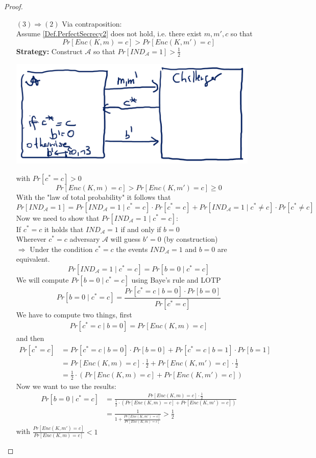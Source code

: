 \begin{proof}
\begin{itemize}
    			\item[$(3) \Rightarrow (2)$] Via contraposition:\\
    				Assume \cref{Def.PerfectSecrecy2} does not hold, i.e. there exist $m,m',c$ so that
    					$$Pr[Enc(K,m)=c] > Pr[Enc(K,m')=c]$$
    				\textbf{Strategy:} Construct $\mathcal{A}$ so that $Pr[IND_{\mathcal{A}}=1] > \frac{1}{2}$
    				\begin{center}
						\includegraphics[width=120mm]{Graphics/Perfect Secrecy/Proof(3)to(2).png}\newline
					\end{center}
					with $Pr[c^* = c] > 0$
						$$Pr[Enc(K,m)=c] > Pr[Enc(K,m')=c] \geq 0$$
					With the "law of total probability" it follows that
						$$Pr[IND_{\mathcal{A}}=1] = Pr[IND_{\mathcal{A}}=1 \mid c^*=c] \cdot Pr[c^* = c] + Pr[IND_{\mathcal{A}}=1 \mid c^* \neq c] \cdot Pr[c^* \neq c]$$
					Now we need to show that $Pr[IND_{\mathcal{A}}=1 \mid c^*=c]$:\\
					If $c^* = c$ it holds that $IND_{\mathcal{A}}=1$ if and only if $b=0$\\
					Wherever $c^* = c$ adversary $\mathcal{A}$ will guess $b' = 0$ (by construction)\\
					$\Rightarrow$ Under the condition $c^* = c$ the events $IND_{\mathcal{A}}=1$ and $b=0$ are equivalent.
						$$Pr[IND_{\mathcal{A}}=1 \mid c^* = c] = Pr[b=0 \mid c^* = c]$$
					We will compute $Pr[b=0 \mid c^* = c]$ using Baye's rule and LOTP
						$$Pr[b=0 \mid c^* = c] = \frac{Pr[c^* = c \mid b=0] \cdot Pr[b=0]}{Pr[c^* = c]}$$
					We have to compute two things, first
					\begin{align*}
						Pr[c^* = c \mid b=0] = Pr[Enc(K,m)=c]
					\end{align*}
					and then
					\begin{align*}
						Pr[c^* = c] &= Pr[c^* = c \mid b=0] \cdot Pr[b=0] + Pr[c^* = c \mid b=1] \cdot Pr[b=1]\\
						&= Pr[Enc(K,m)=c] \cdot \frac{1}{2} + Pr[Enc(K,m')=c] \cdot \frac{1}{2}\\
						&= \frac{1}{2} \cdot (Pr[Enc(K,m)=c] + Pr[Enc(K,m')=c])
					\end{align*}
					Now we want to use the results:
					\begin{align*}
						Pr[b=0 \mid c^* = c] &= \frac{Pr[Enc(K,m)=c] \cdot \frac{1}{2}}{\frac{1}{2} \cdot (Pr[Enc(K,m)=c] + Pr[Enc(K,m')=c])}\\
						&= \frac{1}{1 + \frac{Pr[Enc(K,m')=c]}{Pr[Enc(K,m)=c]}} > \frac{1}{2}
					\end{align*}
					with $\frac{Pr[Enc(K,m')=c]}{Pr[Enc(K,m)=c]} < 1$
					

\end{itemize}
\end{proof}
